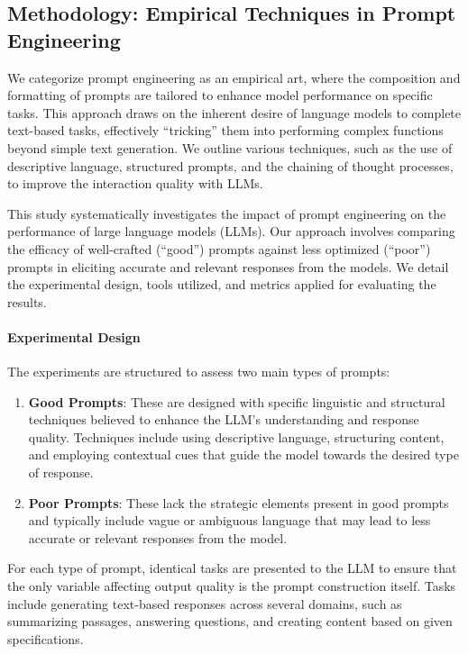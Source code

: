 \documentclass[
]{agujournal2019}
\let\oldparagraph\paragraph
\renewcommand{\paragraph}[1]{\oldparagraph{#1}\mbox{}}
\begin{document}
\subsection{Methodology: Empirical Techniques in Prompt
Engineering}\label{methodology-empirical-techniques-in-prompt-engineering}

We categorize prompt engineering as an empirical art, where the
composition and formatting of prompts are tailored to enhance model
performance on specific tasks. This approach draws on the inherent
desire of language models to complete text-based tasks, effectively
``tricking'' them into performing complex functions beyond simple text
generation. We outline various techniques, such as the use of
descriptive language, structured prompts, and the chaining of thought
processes, to improve the interaction quality with LLMs.

This study systematically investigates the impact of prompt engineering
on the performance of large language models (LLMs). Our approach
involves comparing the efficacy of well-crafted (``good'') prompts
against less optimized (``poor'') prompts in eliciting accurate and
relevant responses from the models. We detail the experimental design,
tools utilized, and metrics applied for evaluating the results.

\paragraph{Experimental Design}\label{experimental-design}

The experiments are structured to assess two main types of prompts:

\begin{enumerate}
\def\labelenumi{\arabic{enumi}.}
\item
  \textbf{Good Prompts}: These are designed with specific linguistic and
  structural techniques believed to enhance the LLM's understanding and
  response quality. Techniques include using descriptive language,
  structuring content, and employing contextual cues that guide the
  model towards the desired type of response.
\item
  \textbf{Poor Prompts}: These lack the strategic elements present in
  good prompts and typically include vague or ambiguous language that
  may lead to less accurate or relevant responses from the model.
\end{enumerate}

For each type of prompt, identical tasks are presented to the LLM to
ensure that the only variable affecting output quality is the prompt
construction itself. Tasks include generating text-based responses
across several domains, such as summarizing passages, answering
questions, and creating content based on given specifications.
\end{document}
